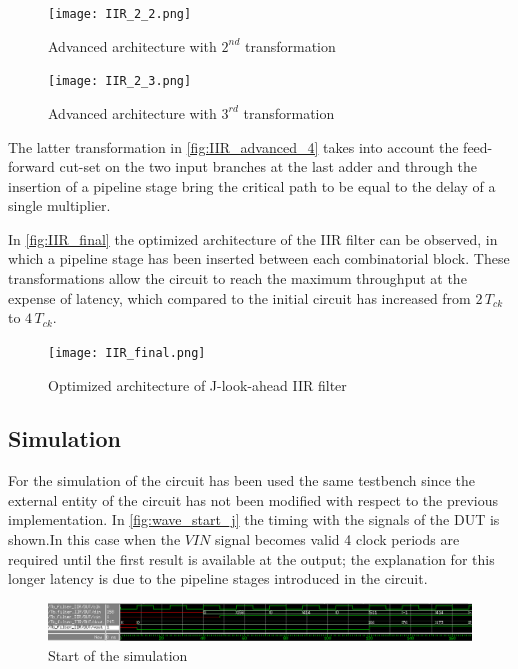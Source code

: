 \begin{figure}[ht]
	\begin{minipage}[b]{0.5\linewidth}
		\centering
		\texttt{[image: IIR\_2\_2.png]}
		\caption{Advanced architecture with $2^{nd}$ transformation}
		\label{fig:IIR_advanced_3}
	\end{minipage}
	\hspace{0.5cm}
	\begin{minipage}[b]{0.5\linewidth}
		\centering
		\texttt{[image: IIR\_2\_3.png]}
		\caption{Advanced architecture with $3^{rd}$ transformation}
		\label{fig:IIR_advanced_4}
	\end{minipage}
\end{figure}

The latter transformation in \autoref{fig:IIR_advanced_4} takes into account the feed-forward cut-set on the two input branches at the last adder and through the insertion of a pipeline stage bring the critical path to be equal to the delay of a single multiplier.

In \autoref{fig:IIR_final} the optimized architecture of the IIR filter can be observed, in which a pipeline stage has been inserted between each combinatorial block. These transformations allow the circuit to reach the maximum throughput at the expense of latency, which compared to the initial circuit has increased from $2\,T_{ck}$ to $4\,T_{ck}$. 

\begin{figure}[htb]
	\center
	\texttt{[image: IIR\_final.png]}
	\caption{Optimized architecture of J-look-ahead IIR filter}
	\label{fig:IIR_final}
	\end{figure}

\pagebreak

\subsection{Simulation}
For the simulation of the circuit has been used the same testbench since the external entity of the circuit has not been modified with respect to the previous implementation.
In \autoref{fig:wave_start_j} the timing with the signals of the DUT is shown.In this case when the $VIN$ signal becomes valid 4 clock periods are required until the first result is available at the output; the explanation for this longer latency is due to the pipeline stages introduced in the circuit.

\begin{figure}[h]
	\center
	\includegraphics[width=1\textwidth]{images/wave_start_j_look_ahead.png}
	\caption{Start of the simulation}
	\label{fig:wave_start_j}
\end{figure}


